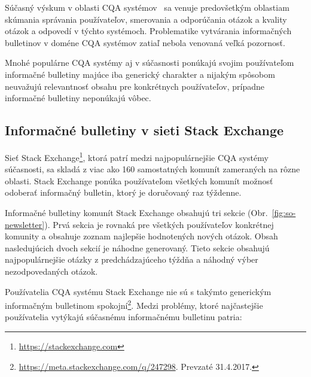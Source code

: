 Súčasný výskum v oblasti CQA systémov~\cite{Srba2016} sa venuje predovšetkým oblastiam skúmania správania používateľov,
smerovania a odporúčania otázok a kvality otázok a odpovedí v týchto systémoch. Problematike vytvárania informačných
bulletinov v doméne CQA systémov zatiaľ nebola venovaná veľká pozornosť.

Mnohé populárne CQA systémy aj v súčasnosti ponúkajú svojim používateľom informačné bulletiny majúce iba generický
charakter a nijakým spôsobom neuvažujú relevantnosť obsahu pre konkrétnych používateľov, prípadne informačné bulletiny
neponúkajú vôbec.

\subsection{Informačné bulletiny v sieti Stack Exchange}\label{so-newsletter}

Sieť Stack Exchange\footnote{ \url{https://stackexchange.com}}, ktorá patrí medzi najpopulárnejšie CQA systémy súčasnosti,
sa skladá z viac ako 160 samostatných komunít zameraných na rôzne oblasti. Stack Exchange ponúka používateľom všetkých
komunít možnosť odoberať informačný bulletin, ktorý je doručovaný raz týždenne.

Informačné bulletiny komunít Stack Exchange obsahujú tri sekcie (Obr.~\ref{fig:so-newsletter}). Prvá sekcia je rovnaká
pre všetkých používateľov konkrétnej komunity a obsahuje zoznam najlepšie hodnotených nových otázok.
Obsah nasledujúcich dvoch sekcií je náhodne generovaný. Tieto sekcie obsahujú najpopulárnejšie otázky z predchádzajúceho
týždňa a náhodný výber nezodpovedaných otázok.

Používatelia CQA systému Stack Exchange nie sú s takýmto generickým informačným bulletinom
spokojní\footnote{\url{https://meta.stackexchange.com/q/247298}. Prevzaté 31.4.2017.}. Medzi problémy, ktoré najčastejšie
používatelia vytýkajú súčasnému informačnému bulletinu patria:

